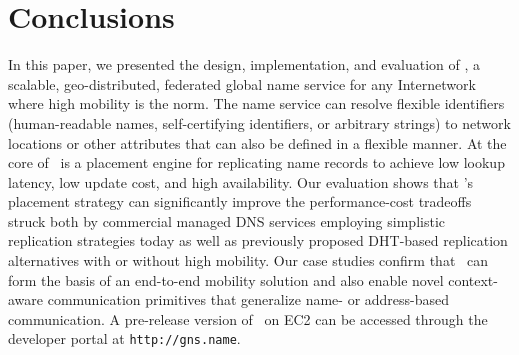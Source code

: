 

\section{Conclusions}

\label{sec:concl}

In this paper, we presented the design, implementation, and evaluation of \auspice, a scalable, geo-distributed, federated global name service for any Internetwork where high mobility is the norm. The name service can resolve flexible identifiers (human-readable names, self-certifying identifiers, or arbitrary strings) to network locations or other attributes that can also be defined in a flexible manner. At the core of \auspice\ is a placement engine for replicating name records to achieve low lookup latency, low update cost, and high availability. Our evaluation shows that \auspice's placement strategy can significantly improve the performance-cost tradeoffs struck both by commercial managed DNS services employing simplistic replication strategies today as well as previously proposed DHT-based replication alternatives with or without high mobility. Our case studies confirm that \auspice\ can form the basis of an end-to-end mobility solution and also enable novel context-aware communication primitives that generalize name- or address-based communication. A pre-release version of \auspice\ on EC2 can be accessed through the developer portal at \verb+http://gns.name+.

